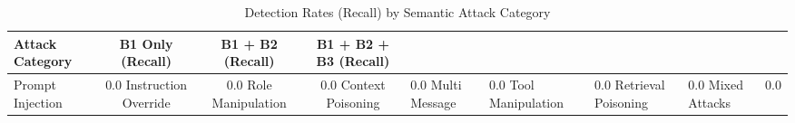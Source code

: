 \begin{table}[h]
\centering
\caption{Detection Rates (Recall) by Semantic Attack Category}
\label{tab:per_category_semantic}
\begin{tabular}{lccc}
\hline
\textbf{Attack Category} & \textbf{B1 Only (Recall)} & \textbf{B1 + B2 (Recall)} & \textbf{B1 + B2 + B3 (Recall)} \\ \hline
Prompt Injection & 0.0%
Instruction Override & 0.0%
Role Manipulation & 0.0%
Context Poisoning & 0.0%
Multi Message & 0.0%
Tool Manipulation & 0.0%
Retrieval Poisoning & 0.0%
Mixed Attacks & 0.0%
\hline
\end{tabular}
\end{table}
